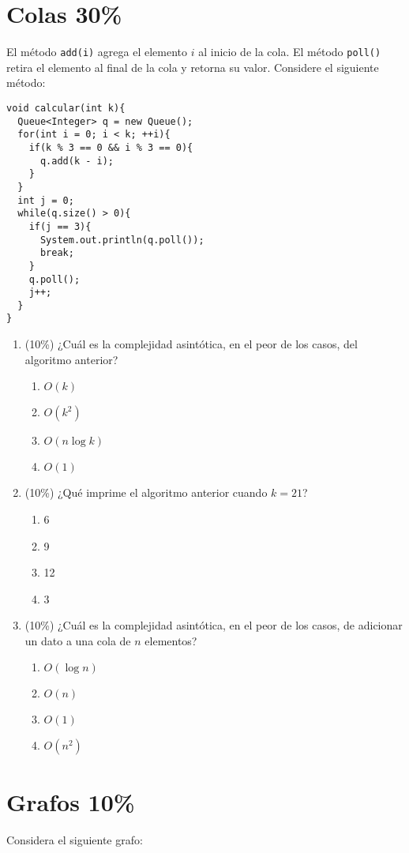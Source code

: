\documentclass[10 pt]{article}
\begin{document}
\begin{multicols}{2}
\section{Colas 30\%}
El método \texttt{add(i)} agrega el elemento $i$ al inicio de la cola. El método \texttt{poll()} retira el elemento al final de la cola y retorna su valor. Considere el siguiente método:
\begin{lstlisting}
void calcular(int k){
  Queue<Integer> q = new Queue();
  for(int i = 0; i < k; ++i){
    if(k % 3 == 0 && i % 3 == 0){
      q.add(k - i);
    }  
  }
  int j = 0;
  while(q.size() > 0){
    if(j == 3){
      System.out.println(q.poll());
      break;    
    }  
    q.poll();
    j++;
  }
}
\end{lstlisting}
\begin{enumerate}[label=\alph*]
\item (10\%) ¿Cuál es la complejidad asintótica, en el peor de los casos, del algoritmo anterior?
\begin{enumerate}[label=(\roman*)]
\item $O(k)$
\item $O(k^2)$
\item $O(n \log k)$
\item $O(1)$
\end{enumerate}
\item (10\%) ¿Qué imprime el algoritmo anterior cuando $k = 21$?
\begin{enumerate}[label=(\roman*)]
\item 6
\item 9
\item 12
\item 3
\end{enumerate}
\item (10\%) ¿Cuál es la complejidad asintótica, en el peor de los casos, de adicionar un dato a una cola de $n$ elementos?
\begin{enumerate}[label=(\roman*)]
\item $O(\log n)$
\item $O(n)$
\item $O(1)$
\item $O(n^2)$
\end{enumerate}
\end{enumerate}
\section{Grafos 10\%}
Considera el siguiente grafo:
\\
\begin{center}
\begin{tikzpicture}


\end{tikzpicture}
\end{center}
\end{multicols}
\end{document}

